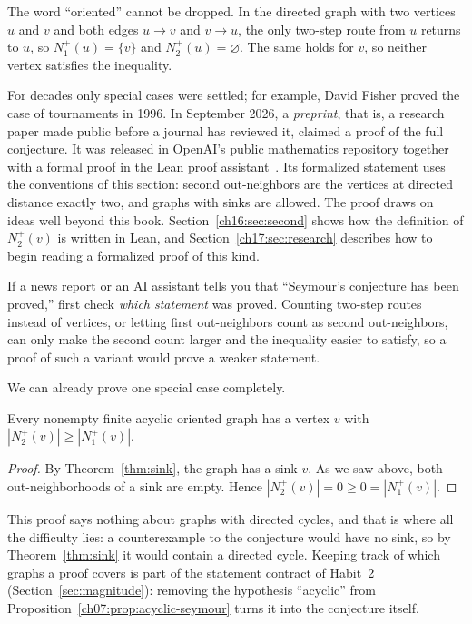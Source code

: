 The word ``oriented'' cannot be dropped. In the directed graph with two vertices $u$ and $v$ and both edges $u\to v$ and $v\to u$, the only two-step route from $u$ returns to $u$, so $N_1^+(u)=\{v\}$ and $N_2^+(u)=\varnothing$. The same holds for $v$, so neither vertex satisfies the inequality.

For decades only special cases were settled; for example, David Fisher proved the case of tournaments in 1996. In September 2026, a \emph{preprint}, that is, a research paper made public before a journal has reviewed it, claimed a proof of the full conjecture. It was released in OpenAI's public mathematics repository together with a formal proof in the Lean proof assistant~\cite{oai173}. Its formalized statement uses the conventions of this section: second out-neighbors are the vertices at directed distance exactly two, and graphs with sinks are allowed. The proof draws on ideas well beyond this book. Section~\ref{ch16:sec:second} shows how the definition of $N_2^+(v)$ is written in Lean, and Section~\ref{ch17:sec:research} describes how to begin reading a formalized proof of this kind.

If a news report or an AI assistant tells you that ``Seymour's conjecture has been proved,'' first check \emph{which statement} was proved. Counting two-step routes instead of vertices, or letting first out-neighbors count as second out-neighbors, can only make the second count larger and the inequality easier to satisfy, so a proof of such a variant would prove a weaker statement.

We can already prove one special case completely.

\par\noindent\begin{minipage}{\linewidth}
\begin{proposition}\label{ch07:prop:acyclic-seymour}
Every nonempty finite acyclic oriented graph has a vertex $v$ with $|N_2^+(v)|\ge|N_1^+(v)|$.
\end{proposition}
\end{minipage}\par

\begin{proof}
By Theorem~\ref{thm:sink}, the graph has a sink $v$. As we saw above, both out-neighborhoods of a sink are empty. Hence $|N_2^+(v)|=0\ge0=|N_1^+(v)|$.
\end{proof}

This proof says nothing about graphs with directed cycles, and that is where all the difficulty lies: a counterexample to the conjecture would have no sink, so by Theorem~\ref{thm:sink} it would contain a directed cycle. Keeping track of which graphs a proof covers is part of the statement contract of Habit~2 (Section~\ref{sec:magnitude}): removing the hypothesis ``acyclic'' from Proposition~\ref{ch07:prop:acyclic-seymour} turns it into the conjecture itself.
